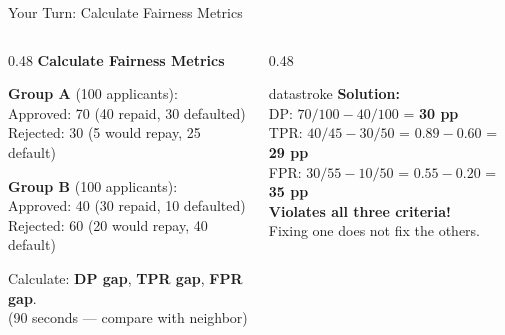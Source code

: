 \documentclass[aspectratio=169, 12pt]{beamer}
\begin{document}
\begin{frame}{Your Turn: Calculate Fairness Metrics}

\footnotesize
\begin{columns}[T]
  \begin{column}{0.48\textwidth}
    {\normalsize\bfseries Calculate Fairness Metrics}

    \vspace{0.15cm}
    \textbf{Group A} (100 applicants):\\
    Approved: 70 (40 repaid, 30 defaulted)\\
    Rejected: 30 (5 would repay, 25 default)

    \vspace{0.1cm}
    \textbf{Group B} (100 applicants):\\
    Approved: 40 (30 repaid, 10 defaulted)\\
    Rejected: 60 (20 would repay, 40 default)

    \vspace{0.1cm}
    Calculate: \textbf{DP gap}, \textbf{TPR gap}, \textbf{FPR gap}.\\
    {\scriptsize\textcolor{midgray}{(90 seconds --- compare with neighbor)}}
  \end{column}
  \begin{column}{0.48\textwidth}
    \pause
    \begin{mlsyscard}{datastroke}
    \textbf{Solution:}\\[0.1cm]
    {\scriptsize
    DP: $70/100 - 40/100$ = \textbf{30 pp}\\[0.05cm]
    TPR: $40/45 - 30/50$ = $0.89 - 0.60$ = \textbf{29 pp}\\[0.05cm]
    FPR: $30/55 - 10/50$ = $0.55 - 0.20$ = \textbf{35 pp}\\[0.1cm]
    \textcolor{errorstroke}{\textbf{Violates all three criteria!}}\\
    Fixing one does not fix the others.
    }
    \end{mlsyscard}
  \end{column}
\end{columns}

\end{frame}
\end{document}
